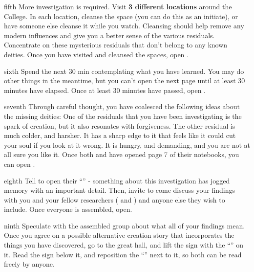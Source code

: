 \documentclass[notebook]{GL2020} %
\begin{document}
\begin{page}{fifth}
More investigation is required. Visit \textbf{3 different locations} around the College. In each location, cleanse the space (you can do this as an initiate), or have someone else cleanse it while you watch. Cleansing should help remove any modern influences and give you a better sense of the various residuals. Concentrate on these mysterious residuals that don’t belong to any known deities. Once you have visited and cleansed the spaces, open .
\end{page}

\begin{page}{sixth}
Spend the next 30 min contemplating what you have learned. You may do other things in the meantime, but you can’t open the next page until at least 30 minutes have elapsed. Once at least 30 minutes have passed, open .
\end{page}

\begin{page}{seventh}
Through careful thought, you have coalesced the following ideas about the missing deities: One of the residuals that you have been investigating is the spark of creation, but it also resonates with forgiveness. The other residual is much colder, and harsher. It has a sharp edge to it that feels like it could cut your soul if you look at it wrong. It is hungry, and demanding, and you are not at all sure you like it.  Once both \cHeadScientist{} and \cEbbPriest{} have opened page 7 of their notebooks, you can open .
\end{page}

\begin{page}{eighth}
Tell \cDisney{} to open their “\mWThree{\MyName}” - something about this investigation has jogged \cDisney{\their} memory with an important detail. Then, invite \cDisney{} to come discuss your findings with you and your fellow researchers ( \cHeadScientist{} and \cEbbPriest{}) and anyone else they wish to include.  Once everyone is assembled, open.
\end{page}

\begin{page}{ninth}
Speculate with the assembled group about what all of your findings mean. Once you agree on a possible alternative creation story that incorporates the things you have discovered, go to the great hall, and lift the sign with the ``\sCreationMythOfficial{}'' on it. Read the sign below it, and reposition the ``\sCreationMythOfficial{}'' next to it, so both can be read freely by anyone.
\end{page}

\endnotebook
\end{document}
